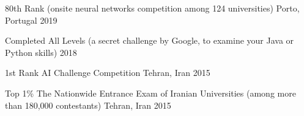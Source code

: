 

\begin{cvhonors}

  \cvhonor
    {80th Rank} %
    { (onsite neural networks competition among 124 universities)} %
    {Porto, Portugal} %
    {2019} %

  \cvhonor
    {Completed All Levels} %
    { (a secret challenge by Google, to examine your Java or Python skills)} %
    {} %
    {2018} %

  \cvhonor
    {1st Rank} %
    { AI Challenge Competition} %
    {Tehran, Iran} %
    {2015} %

  \cvhonor
    {Top 1\%} %
    {The Nationwide Entrance Exam of Iranian Universities (among more than 180,000 contestants)} %
    {Tehran, Iran} %
    {2015} %


\end{cvhonors}
